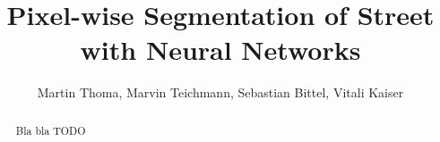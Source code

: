 \documentclass[technote,a4paper]{IEEEtran}
\title{Pixel-wise Segmentation of Street with Neural Networks}
\author{Martin Thoma, Marvin Teichmann, Sebastian Bittel, Vitali Kaiser}
\begin{document}
\maketitle
\begin{abstract}
Bla bla TODO
\end{abstract}













\end{document}
